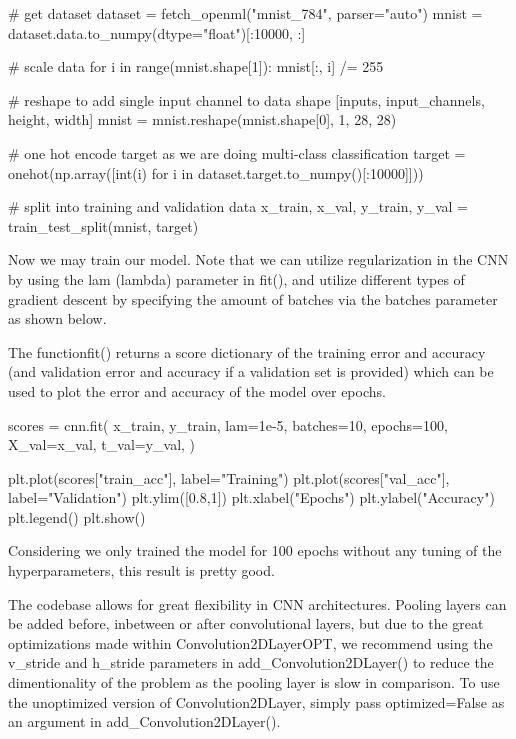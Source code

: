 \documentclass[%
oneside,                 %
final,                   %
10pt]{article}
\begin{document}
# get dataset
dataset = fetch_openml("mnist_784", parser="auto")
mnist = dataset.data.to_numpy(dtype="float")[:10000, :]

# scale data
for i in range(mnist.shape[1]):
    mnist[:, i] /= 255
    
# reshape to add single input channel to data shape [inputs, input_channels, height, width]
mnist = mnist.reshape(mnist.shape[0], 1, 28, 28)

# one hot encode target as we are doing multi-class classification
target = onehot(np.array([int(i) for i in dataset.target.to_numpy()[:10000]]))

# split into training and validation data
x_train, x_val, y_train, y_val = train_test_split(mnist, target)

\epycod


Now we may train our model. Note that we can utilize regularization in
the CNN by using the lam (lambda) parameter in fit(), and utilize
different types of gradient descent by specifying the amount of
batches via the batches parameter as shown below.

The functionfit() returns a score dictionary of the training error and
accuracy (and validation error and accuracy if a validation set is
provided) which can be used to plot the error and accuracy of the
model over epochs.



















\bpycod
scores = cnn.fit(
    x_train,
    y_train,
    lam=1e-5,
    batches=10,
    epochs=100,
    X_val=x_val,
    t_val=y_val,
)

plt.plot(scores["train_acc"], label="Training")
plt.plot(scores["val_acc"], label="Validation")
plt.ylim([0.8,1])
plt.xlabel("Epochs")
plt.ylabel("Accuracy")
plt.legend()
plt.show()

\epycod


Considering we only trained the model for 100 epochs without any tuning of the hyperparameters, this result is pretty good.

The codebase allows for great flexibility in CNN
architectures. Pooling layers can be added before, inbetween or after
convolutional layers, but due to the great optimizations made within
Convolution2DLayerOPT, we recommend using the v_stride and h_stride
parameters in add_Convolution2DLayer() to reduce the dimentionality of
the problem as the pooling layer is slow in comparison. To use the
unoptimized version of Convolution2DLayer, simply pass optimized=False
as an argument in add_Convolution2DLayer().
\end{document}
